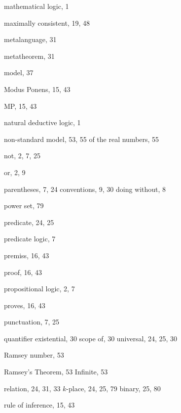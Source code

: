 \documentclass[12pt]{amsbook}
\theoremstyle{plain}
\theoremstyle{definition}
\theoremstyle{remark}
\begin{document}
\begin{theindex}
  \indexspace

  \item mathematical logic, 1
  \item maximally consistent, 19, 48
  \item metalanguage, 31
  \item metatheorem, 31
  \item model, 37
  \item Modus Ponens, 15, 43
  \item MP, 15, 43

  \indexspace

  \item natural deductive logic, 1
  \item non-standard model, 53, 55
    \subitem of the real numbers, 55
  \item not, 2, 7, 25

  \indexspace

  \item or, 2, 9

  \indexspace

  \item parentheses, 7, 24
    \subitem conventions, 9, 30
    \subitem doing without, 8
  \item power set, 79
  \item predicate, 24, 25
  \item predicate logic, 7
  \item premiss, 16, 43
  \item proof, 16, 43
  \item propositional logic, 2, 7
  \item proves, 16, 43
  \item punctuation, 7, 25

  \indexspace

  \item quantifier 
    \subitem existential, 30
    \subitem scope of, 30
    \subitem universal, 24, 25, 30

  \indexspace

  \item Ramsey number, 53
  \item Ramsey's Theorem, 53
    \subitem Infinite, 53
  \item relation, 24, 31, 33
    \subitem $k$-place, 24, 25, 79
    \subitem binary, 25, 80
  \item rule of inference, 15, 43

  \indexspace


\end{theindex}
\end{document}
